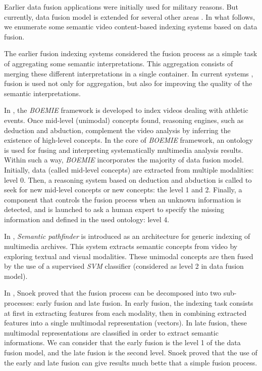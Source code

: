 	Earlier data fusion applications were initially used for military reasons. But currently,  data fusion   
	model is extended for several other areas \citep{Liggins2008}. In what follows, we enumerate some semantic 
	video content-based indexing systems based on data fusion.

	The earlier fusion indexing systems \citep{Adams2002,Amir2003,Hauptmann2003} considered the fusion process as 
	a simple task of aggregating some semantic interpretations. 
	This aggregation consists of merging these different interpretations in a single container. 
	In current systems \citep{Snoek2006,Kosmopoulos2006,Ayache2007a,Ayache2007b,Athanasiadis2009,Vrochidis2010}, 
	fusion is used not only for aggregation, but also for improving 
	the quality of the semantic interpretations.


			In \citep{Karkaletsis2005,Kosmopoulos2006a}, the \emph{BOEMIE} framework is developed to index videos 
			dealing with athletic events.
			Once mid-level (unimodal) concepts found, reasoning engines, such as
			deduction and abduction, complement the video analysis by inferring the existence of high-level concepts. 
			In the core of \emph{BOEMIE} framework, an ontology is used for fusing and interpreting
			systematically multimedia analysis results. 
			Within such a way, \emph{BOEMIE} incorporates the majority of data fusion model. 
			Initially, data (called mid-level concepts) are extracted from multiple modalities: level 0. 
			Then, a reasoning system based on deduction and abduction is called to seek for new mid-level 
			concepts or new concepts: the level 1 and 2. Finally, a component that controls the fusion process when 
			an unknown information is detected, 
			and is launched to ask a human expert to specify the missing information and defined in the used ontology: level 4.

		In \citep{Snoek2006}, \emph{Semantic pathfinder} is introduced as an architecture for generic indexing of multimedia 
		archives. This system extracts semantic concepts from video by exploring textual and visual 
		modalities. These unimodal concepts are then fused by the use of a supervised \emph{SVM} classifier 
		(considered as level 2 in data fusion model).

		In \citep{Snoek2005a}, Snoek proved that the fusion process can be decomposed into two sub-processes: early 
		fusion and late fusion. In early fusion, the indexing task consists at first in extracting
		features from each modality, then in combining extracted features into a single multimodal representation (vectors).
		In late fusion, these multimodal representations are classified in order to extract semantic informations.
		We can consider that  the early fusion is the level 1 of the data fusion model, and the late fusion is the second level.
		Snoek proved that the use of the early and late fusion can give results much bette that a simple fusion process.

